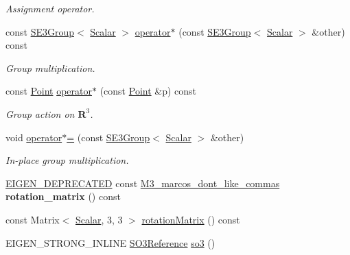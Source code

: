 \begin{DoxyCompactItemize}
\begin{DoxyCompactList}\small\item\em Assignment operator. \end{DoxyCompactList}\item 
const \hyperlink{class_sophus_1_1_s_e3_group}{S\+E3\+Group}$<$ \hyperlink{class_sophus_1_1_s_e3_group_base_aa3db86a2cabe32d3c299dda41af181cc}{Scalar} $>$ \hyperlink{class_sophus_1_1_s_e3_group_base_a9a21f334a8d85478cc063b1cc8bd883c}{operator$\ast$} (const \hyperlink{class_sophus_1_1_s_e3_group}{S\+E3\+Group}$<$ \hyperlink{class_sophus_1_1_s_e3_group_base_aa3db86a2cabe32d3c299dda41af181cc}{Scalar} $>$ \&other) const 
\begin{DoxyCompactList}\small\item\em Group multiplication. \end{DoxyCompactList}\item 
const \hyperlink{class_sophus_1_1_s_e3_group_base_aca2cf20e857567b74fb399c7ee76c744}{Point} \hyperlink{class_sophus_1_1_s_e3_group_base_a0fdcdb6c6b858e4e9b8e4c9f4f06aeca}{operator$\ast$} (const \hyperlink{class_sophus_1_1_s_e3_group_base_aca2cf20e857567b74fb399c7ee76c744}{Point} \&p) const 
\begin{DoxyCompactList}\small\item\em Group action on $ \mathbf{R}^3 $. \end{DoxyCompactList}\item 
void \hyperlink{class_sophus_1_1_s_e3_group_base_a897562fa40e2e552b701d6be43d8ee4c}{operator$\ast$=} (const \hyperlink{class_sophus_1_1_s_e3_group}{S\+E3\+Group}$<$ \hyperlink{class_sophus_1_1_s_e3_group_base_aa3db86a2cabe32d3c299dda41af181cc}{Scalar} $>$ \&other)
\begin{DoxyCompactList}\small\item\em In-\/place group multiplication. \end{DoxyCompactList}\item 
\hyperlink{class_sophus_1_1_rx_s_o3_group}{E\+I\+G\+E\+N\+\_\+\+D\+E\+P\+R\+E\+C\+A\+T\+ED} const \hyperlink{class_sophus_1_1_s_e3_group_base_a4a50d722144fb9350ef4beaa975e45b4}{M3\+\_\+marcos\+\_\+dont\+\_\+like\+\_\+commas} {\bfseries rotation\+\_\+matrix} () const \hypertarget{class_sophus_1_1_s_e3_group_base_af12195a50684095057079c829f5752f9}{}\label{class_sophus_1_1_s_e3_group_base_af12195a50684095057079c829f5752f9}

\item 
const Matrix$<$ \hyperlink{class_sophus_1_1_s_e3_group_base_aa3db86a2cabe32d3c299dda41af181cc}{Scalar}, 3, 3 $>$ \hyperlink{class_sophus_1_1_s_e3_group_base_adbfc9d61a4a27f9b5e73fa22519e61de}{rotation\+Matrix} () const 
\item 
E\+I\+G\+E\+N\+\_\+\+S\+T\+R\+O\+N\+G\+\_\+\+I\+N\+L\+I\+NE \hyperlink{class_sophus_1_1_s_e3_group_base_a33db661528fe06afc4d597c5c3c1f85d}{S\+O3\+Reference} \hyperlink{class_sophus_1_1_s_e3_group_base_aed7500122c419580853f85c83630e2f2}{so3} ()\hypertarget{class_sophus_1_1_s_e3_group_base_aed7500122c419580853f85c83630e2f2}{}\label{class_sophus_1_1_s_e3_group_base_aed7500122c419580853f85c83630e2f2}


\end{DoxyCompactItemize}
